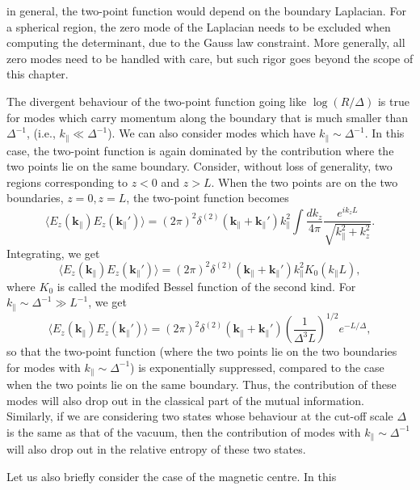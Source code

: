 in general, the two-point function would depend on the boundary Laplacian. For
a spherical region, the zero mode of the Laplacian needs to be excluded when
computing the determinant, due to the Gauss law constraint. More generally, all
zero modes need to be handled with care, but such rigor goes beyond the scope
of this chapter.
\par The divergent behaviour of the two-point function going like
$\log(R/\Delta)$ is true for modes which carry momentum along the boundary that
is much smaller than $\Delta^{-1}$, (i.e., $k_{\|}\ll\Delta^{-1}$). We can also
consider modes which have $k_{\|}\sim\Delta^{-1}$. In this case, the two-point
function is again dominated by the contribution where the two points lie on the
same boundary. Consider, without loss of generality, two regions corresponding
to $z<0$ and $z>L$. When the two points are on the two boundaries, $z=0, z=L$,
the two-point function becomes
\begin{equation}
  \langle E_z(\mathbf{k}_{\|})E_z(\mathbf{k}_{\|}')\rangle
  = (2\pi)^2\delta^{(2)}(\mathbf{k}_{\|}+\mathbf{k}_{\|}')k^2_{\|}\int
  \frac{dk_z}{4\pi}\frac{e^{ik_zL}}{\sqrt{k^2_{\|}+k^2_z}}.  
\end{equation}
Integrating, we get
\begin{equation}
  \langle E_z(\mathbf{k}_{\|})E_z(\mathbf{k}_{\|}')\rangle
  = (2\pi)^2\delta^{(2)}(\mathbf{k}_{\|}+\mathbf{k}_{\|}')k^2_{\|}K_0(k_{\|}L),
\end{equation}
where $K_0$ is called the modifed Bessel function of the second kind. For
$k_{\|}\sim\Delta^{-1}\gg L^{-1}$, we get
\begin{equation}
  \langle E_z(\mathbf{k}_{\|})E_z(\mathbf{k}_{\|}')\rangle
  = (2\pi)^2\delta^{(2)}(\mathbf{k}_{\|}+\mathbf{k}_{\|}')\left(\frac{1}{\Delta^3
  L}\right)^{1/2}e^{-L/\Delta},
\end{equation}
so that the two-point function (where the two points lie on the two boundaries
for modes with $k_{\|}\sim\Delta^{-1}$) is exponentially suppressed, compared
to the case when the two points lie on the same boundary. Thus, the
contribution of these modes will also drop out in the classical part of the
mutual information. Similarly, if we are considering two states whose behaviour
at the cut-off scale $\Delta$ is the same as that of the vacuum, then the 
contribution of modes with $k_{\|}\sim\Delta^{-1}$ will also drop out
in the relative entropy of these two states.
\par Let us also briefly consider the case of the magnetic centre. In this
